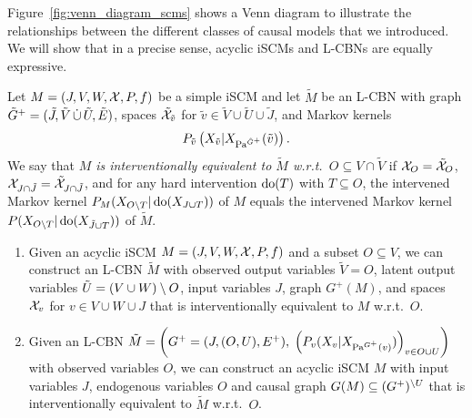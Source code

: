 
Figure~\ref{fig:venn_diagram_scms} shows a Venn diagram to illustrate the relationships between the different
classes of causal models that we introduced.
We will show that in a precise sense, acyclic iSCMs and L-CBNs are equally expressive.
\begin{Def}\label{def:interventional_equivalence_cbn_scm}
  Let $M = \left ( J, V, W, \mathcal{X}, P, f \right )$ be a simple iSCM and let $\tilde{M}$ be an L-CBN with graph
  $\tilde{G}^+ = (\tilde{J},\tilde{V}\,\dot{\cup}\,\tilde{U},\tilde{E})$, spaces $\tilde{\mathcal{X}}_{\tilde v}$ for $\tilde{v} \in \tilde{V} \cup \tilde{U} \cup \tilde{J}$,
  and Markov kernels $$P_{\tilde{v}}\left ( X_{\tilde{v}} | X_{\mathrm{Pa}^{\tilde{G}^+}}(\tilde{v}) \right ).$$
  We say that \emph{$M$ is interventionally equivalent to $\tilde{M}$ w.r.t.\ $O \subseteq V \cap \tilde{V}$} if
  $\mathcal{X}_O = \tilde{\mathcal{X}}_O$, $\mathcal{X}_{J \cap \tilde{J}} = \tilde{\mathcal{X}}_{J \cap \tilde{J}}$, and
  for any hard intervention $\operatorname{do}(T)$ with $T \subseteq O$, the intervened Markov kernel $P_M(X_{O\setminus T}|\operatorname{do}(X_{J\cup T}))$ of $M$ equals the intervened Markov kernel $P(X_{O\setminus T}|\operatorname{do}(X_{\tilde{J}\cup T}))$ of $\tilde{M}$.
\end{Def}
\begin{Prp}\label{prp:interventional_equivalence_cbn_scm}
  \begin{enumerate}[label=\roman*)]
    \item Given an acyclic iSCM $M = \left ( J, V, W, \mathcal{X}, P, f \right )$ and a subset $O \subseteq V$, we can construct an L-CBN $\tilde{M}$ with observed output variables $\tilde{V} = O$, latent output variables $\tilde{U} = (V \cup W) \setminus O$, input variables $J$, graph $G^+(M)$, and spaces $\mathcal{X}_v$ for $v \in V\cup W \cup J$ that is interventionally equivalent to $M$ w.r.t.\ $O$.
    \label{prp:interventional_equivalence_cbn_scm:scm2cbn}
    \item Given an L-CBN 
      $\tilde{M} = \left ( G^+=(J,(O,U),E^+), \; \left ( P_v(X_v| X_{\mathrm{Pa}^{G^+}(v)}) \right )_{v\in O \cup U} \right )$
      with observed variables $O$, we can construct 
      an acyclic iSCM $M$ with input variables $J$, endogenous variables $O$ and causal graph $G(M) \subseteq (G^+)^{\setminus U}$ that is interventionally equivalent to $\tilde{M}$ w.r.t.\ $O$.
    \label{prp:interventional_equivalence_cbn_scm:cbn2scm}
  \end{enumerate}
\end{Prp}
